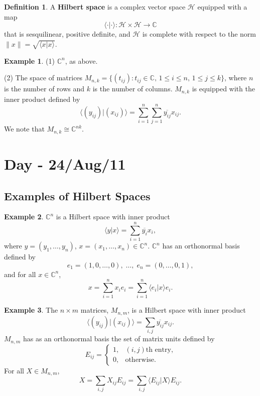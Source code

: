 \documentclass[12pt]{article}
\theoremstyle{definition}
\newtheorem*{definition}{Definition}
\newtheorem*{example}{Example}
\newcommand{\braket}[2]{\langle #1|#2\rangle}
\newcommand{\norm}[1]{\|#1\|}
\newcommand{\C}{\mathbb{C}}
\begin{document}
\begin{definition}
A \textbf{Hilbert space} is a complex vector space $\mathcal{H}$ equipped with a map
\[
\langle\cdot|\cdot\rangle : \mathcal{H} \times \mathcal{H} \to \C
\]
that is sesquilinear, positive definite, and $\mathcal{H}$ is complete with respect to the norm $\norm{x} = \sqrt{\braket{x}{x}}$.
\end{definition}

\begin{example}
(1) $\C^n$, as above.

(2) The space of matrices $M_{n,k} = \{(t_{ij}) : t_{ij} \in \C,\, 1 \leq i \leq n,\, 1 \leq j \leq k\}$, where $n$ is the number of rows and $k$ is the number of columns. $M_{n,k}$ is equipped with the inner product defined by
\[
\langle (y_{ij}) | (x_{ij}) \rangle = \sum_{i=1}^n \sum_{j=1}^n \overline{y_{ij}} x_{ij}.
\]
We note that $M_{n,k} \cong \C^{nk}$.
\end{example}

\section{Day - 24/Aug/11}

\subsection{Examples of Hilbert Spaces}

\begin{example}
$\C^n$ is a Hilbert space with inner product
\[
\braket{y}{x} = \sum_{i=1}^n \overline{y_i} x_i,
\]
where $y = (y_1,\ldots,y_n)$, $x = (x_1,\ldots,x_n) \in \C^n$. $\C^n$ has an orthonormal basis defined by
\[
e_1 = (1,0,\ldots,0),\;\ldots,\;e_n = (0,\ldots,0,1),
\]
and for all $x \in \C^n$,
\[
x = \sum_{i=1}^n x_i e_i = \sum_{i=1}^n \braket{e_i}{x} e_i.
\]
\end{example}

\begin{example}
The $n \times m$ matrices, $M_{n,m}$, is a Hilbert space with inner product
\[
\langle (y_{ij}) | (x_{ij}) \rangle = \sum_{i,j} \overline{y_{ij}} x_{ij}.
\]
$M_{n,m}$ has as an orthonormal basis the set of matrix units defined by
\[
E_{ij} = \begin{cases} 1, & (i,j)\text{th entry,}\\ 0, & \text{otherwise.}\end{cases}
\]
For all $X \in M_{n,m}$,
\[
X = \sum_{i,j} X_{ij} E_{ij} = \sum_{i,j} \langle E_{ij}|X\rangle E_{ij}.
\]
\end{example}
\end{document}
